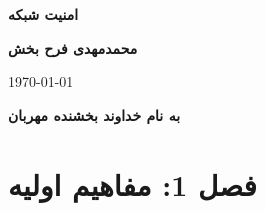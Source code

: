 \documentclass{report}
\begin{document}
	
	\begin{titlepage}
		
		\centering
		\vspace*{2cm}
		\textbf{\LARGE امنیت شبکه}
		\vspace{1cm}
		
		
		
		\vfill
		
		\textbf{محمدمهدی فرح بخش}
		
		\vspace{1cm}
		\today
	\end{titlepage}
	
	
	\begin{center}
		\textbf{به نام خداوند بخشنده مهربان}
	\end{center}
	\section{
	فصل 1: مفاهیم اولیه
	}
\end{document}
